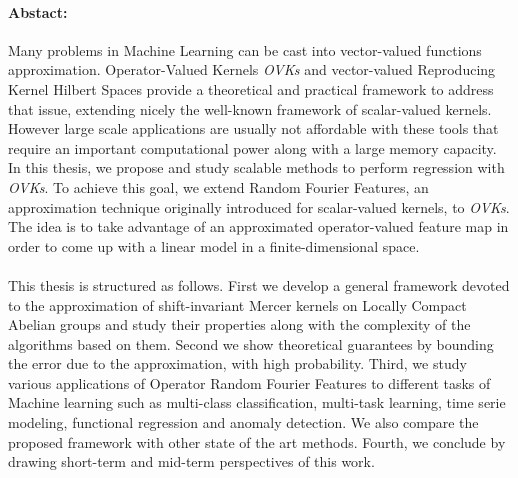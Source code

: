 
\pagestyle{empty}


\begin{center}
\textbf{\spacedlowsmallcaps{\mySubtitle}}
\end{center}

\footnotesize
\paragraph{Abstact:} Many problems in Machine Learning can be cast into vector-valued functions approximation. Operator-Valued Kernels \emph{\acl{OVK}s} and vector-valued Reproducing Kernel Hilbert Spaces provide a theoretical and practical framework to address that issue, extending nicely the well-known framework of scalar-valued kernels. However large scale applications are usually not affordable with these tools that require an important computational power along with a large memory capacity. In this thesis, we propose and study scalable methods to perform regression with \emph{\acl{OVK}s}. To achieve this goal, we extend Random Fourier Features, an approximation technique originally introduced for scalar-valued kernels, to \emph{\acl{OVK}s}. The idea is to take advantage of an approximated operator-valued feature map in order to come up with a linear model in a finite-dimensional space.
\paragraph{}
This thesis is structured as follows. First we develop a general framework devoted to the approximation of shift-invariant Mercer kernels on Locally Compact Abelian groups and study their properties along with the complexity of the algorithms based on them. Second we show theoretical guarantees by bounding the error due to the approximation, with high probability. Third, we study various applications of Operator Random Fourier Features to different tasks of Machine learning such as multi-class classification, multi-task learning, time serie modeling, functional regression and anomaly detection. We also compare the proposed framework with other state of the art methods. Fourth, we conclude by drawing short-term and mid-term perspectives of this work.

